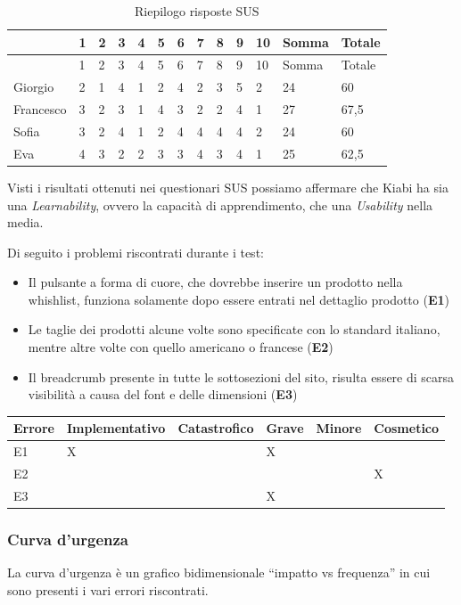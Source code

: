 \documentclass[12pt,italian,]{report}
\begin{document}
\begin{longtable}[]{@{}lllllllllllll@{}}
\caption{Riepilogo risposte SUS}\tabularnewline
\toprule
& 1 & 2 & 3 & 4 & 5 & 6 & 7 & 8 & 9 & 10 & Somma & Totale\tabularnewline
\midrule
\endfirsthead
\toprule
& 1 & 2 & 3 & 4 & 5 & 6 & 7 & 8 & 9 & 10 & Somma & Totale\tabularnewline
\midrule
\endhead
Giorgio & 2 & 1 & 4 & 1 & 2 & 4 & 2 & 3 & 5 & 2 & 24 & 60\tabularnewline
Francesco & 3 & 2 & 3 & 1 & 4 & 3 & 2 & 2 & 4 & 1 & 27 &
67,5\tabularnewline
Sofia & 3 & 2 & 4 & 1 & 2 & 4 & 4 & 4 & 4 & 2 & 24 &
60\tabularnewline
Eva & 4 & 3 & 2 & 2 & 3 & 3 & 4 & 3 & 4 & 1 & 25 &
62,5\tabularnewline
\bottomrule
\end{longtable}

Visti i risultati ottenuti nei questionari SUS possiamo affermare che Kiabi ha sia una \emph{Learnability}, ovvero la capacità di apprendimento, che una \emph{Usability} nella media.

Di seguito i problemi riscontrati durante i test:

\begin{itemize}
\item Il pulsante a forma di cuore, che dovrebbe inserire un prodotto nella whishlist, funziona solamente dopo essere entrati nel dettaglio prodotto (\textbf{E1})
\item Le taglie dei prodotti alcune volte sono specificate con lo standard italiano, mentre altre volte con quello americano o francese (\textbf{E2})
\item Il breadcrumb presente in tutte le sottosezioni del sito, risulta essere di scarsa visibilità a causa del font e delle dimensioni (\textbf{E3})
\end{itemize}

\begin{longtable}[]{@{}llllll@{}}
\toprule
Errore & Implementativo & Catastrofico & Grave & Minore &
Cosmetico\tabularnewline
\midrule
\endhead
E1 & X & & X &\tabularnewline
E2 & & & & & X\tabularnewline
E3 & & & X & &\tabularnewline
\bottomrule
\end{longtable}

\subsubsection{Curva d'urgenza}

La curva d'urgenza è un grafico bidimensionale ``impatto vs frequenza'' in cui sono presenti i vari errori riscontrati.
\end{document}
